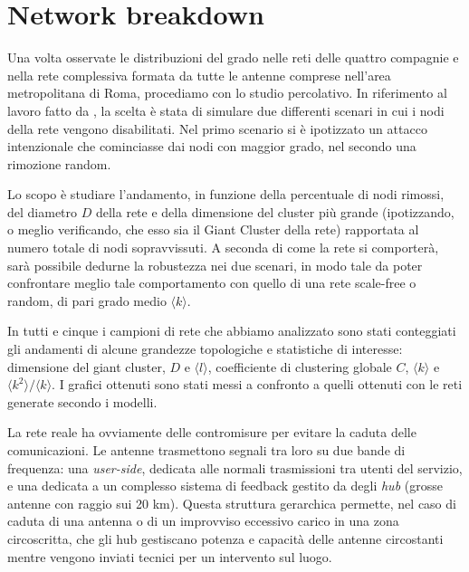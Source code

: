 
\section{Network breakdown}
\label{sec:attaack}

Una volta osservate le distribuzioni del grado nelle reti delle quattro compagnie e nella rete complessiva formata da tutte le antenne comprese nell'area metropolitana di Roma, procediamo con lo studio percolativo. In riferimento al lavoro fatto da \textcite{Barbalbert2000}, la scelta è stata di simulare due differenti scenari in cui i nodi della rete vengono disabilitati. Nel primo scenario si è ipotizzato un attacco intenzionale che cominciasse dai nodi con maggior grado, nel secondo una rimozione random. 

Lo scopo è studiare l'andamento, in funzione della percentuale di nodi rimossi, del diametro $D$ della rete e della dimensione del cluster più grande (ipotizzando, o meglio verificando, che esso sia il Giant Cluster della rete) rapportata al numero totale di nodi sopravvissuti. A seconda di come la rete si comporterà, sarà possibile dedurne la robustezza nei due scenari, in modo tale da poter confrontare meglio tale comportamento con quello di una rete scale-free o random, di pari grado medio $\langle k \rangle$.

In tutti e cinque i campioni di rete che abbiamo analizzato sono stati conteggiati gli andamenti di alcune grandezze topologiche e statistiche di interesse: dimensione del giant cluster, $D$ e $\langle l \rangle$, coefficiente di clustering globale $C$, $\langle k \rangle$ e $\langle k^2 \rangle/\langle k \rangle$. I grafici ottenuti sono stati messi a confronto a quelli ottenuti con le reti generate secondo i modelli.

La rete reale ha ovviamente delle contromisure per evitare la caduta delle comunicazioni. Le antenne trasmettono segnali tra loro su due bande di frequenza: una \emph{user-side}, dedicata alle normali trasmissioni tra utenti del servizio, e una dedicata a un complesso sistema di feedback gestito da degli \emph{hub} (grosse antenne con raggio sui 20 km). Questa struttura gerarchica permette, nel caso di caduta di una antenna o di un improvviso eccessivo carico in una zona circoscritta, che gli hub gestiscano potenza e capacità delle antenne circostanti mentre vengono inviati tecnici per un intervento sul luogo.

